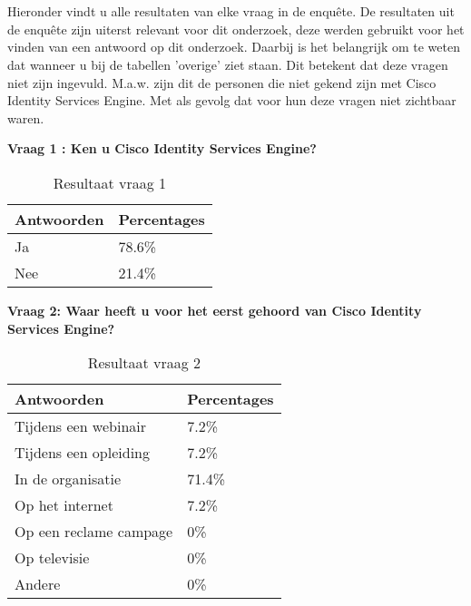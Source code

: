 \chapter{}
\label{ch:Resultaten_enquête}

Hieronder vindt u alle resultaten van elke vraag in de enquête. De resultaten uit de enquête zijn uiterst relevant voor dit onderzoek, deze werden gebruikt voor het vinden van een antwoord op dit onderzoek. Daarbij is het belangrijk om te weten dat wanneer u bij de tabellen 'overige' ziet staan. Dit betekent dat deze vragen niet zijn ingevuld. M.a.w. zijn dit de personen die niet gekend zijn met Cisco Identity Services Engine. Met als gevolg dat voor hun deze vragen niet zichtbaar waren.
\newline

\textbf{Vraag 1 : Ken u Cisco Identity Services Engine?}
\begin{table}[h!]
\begin{center}
		\begin{tabular}{|l|l|}
			\hline
			\bf Antwoorden    & \bf Percentages \\ \hline
			Ja  & 78.6\% \\ \hline
			Nee & 21.4\% \\ \hline
		\end{tabular}
	\caption{Resultaat vraag 1}
\end{center}
\end{table}

\newpage
\textbf{Vraag 2: Waar heeft u voor het eerst gehoord van Cisco Identity Services Engine?}
\begin{table}[H]
	\begin{center}
		\begin{tabular}{|l|l|}
			\hline
			\bf Antwoorden    & \bf Percentages \\ \hline
			Tijdens een webinair   & 7.2\%  \\ \hline
			Tijdens een opleiding  & 7.2\%  \\ \hline
			In de organisatie      & 71.4\% \\ \hline
			Op het internet        & 7.2\%  \\ \hline
			Op een reclame campage & 0\%    \\ \hline
			Op televisie           & 0\%    \\ \hline
			Andere                 & 0\%    \\ \hline
		\end{tabular}
		\caption{Resultaat vraag 2}
	\end{center}
\end{table}



